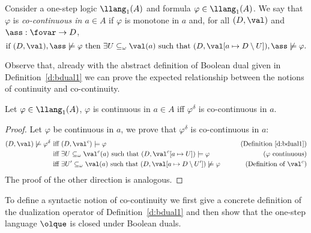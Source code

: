 

Consider a one-step logic $\llang_1(A)$ and formula $\varphi \in \llang_1(A)$.
%
We say that $\varphi$ is \emph{co-continuous in $a\in A$} if $\varphi$ is monotone in $a$ and,
for all $(D,\val)$ and $\ass:\fovar\to D$,
$$
\text{if } (D,\val),\ass \not\models \varphi \text{ then } \exists U \subseteq_\omega \val(a) \text{ such that } (D, \val[a \mapsto D\setminus U]),\ass \not\models \varphi.
$$

Observe that, already with the abstract definition of Boolean dual given in Definition~\ref{d:bdual1} we can prove the expected relationship between the notions of continuity and co-continuity.

\begin{proposition}\label{prop:contdualcocont}
	Let $\varphi \in \llang_1(A)$, $\varphi$ is continuous in $a\in A$ iff $\varphi^\delta$ is co-continuous in $a$.
\end{proposition}
\begin{proof}
Let $\varphi$ be continuous in $a$, we prove that $\varphi^\delta$ is co-continuous in $a$:
\begin{align*}
(D,\val) \not\models \varphi^\delta
& \text{ iff } (D,\val^c) \models \varphi & \tag{Definition~\ref{d:bdual1}} \\
& \text{ iff } \exists U \subseteq_\omega \val^c(a) \text{ such that } (D,\val^c[a\mapsto U]) \models \varphi & \tag{$\varphi$ continuous} \\
& \text{ iff } \exists U' \subseteq_\omega \val(a) \text{ such that } (D,\val[a\mapsto D\setminus U']) \not\models \varphi & \tag{Definition of $\val^c$}
\end{align*}
%
The proof of the other direction is analogous.
\end{proof}

To define a syntactic notion of co-continuity we first give a concrete definition of the dualization operator of Definition~\ref{d:bdual1} and then show that the one-step language $\olque$ is closed under Boolean duals.

